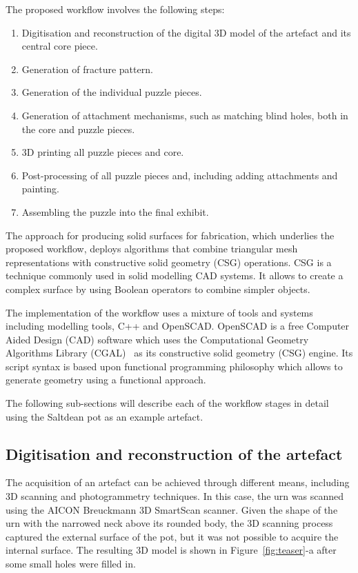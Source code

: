 \documentclass[acmlarge,screen,dvipsnames]{acmart}
\begin{document}
The proposed workflow involves the following steps:
%
\begin{enumerate}
\item Digitisation and reconstruction of the digital 3D model of the artefact and its central core piece.
\item Generation of fracture pattern.
\item Generation of the individual puzzle pieces.
\item Generation of attachment mechanisms, such as matching blind holes, both in the core and puzzle pieces.
\item 3D printing all puzzle pieces and core.
\item Post-processing of all puzzle pieces and, including adding attachments and painting.
\item Assembling the puzzle into the final exhibit.
\end{enumerate}
%

The approach for producing solid surfaces for fabrication, which
underlies the proposed workflow, deploys algorithms that combine
triangular mesh representations with constructive solid geometry (CSG)
operations. CSG is a technique commonly used in solid modelling CAD
systems. It allows to create a complex surface by using Boolean
operators to combine simpler objects.

The implementation of the workflow uses a mixture of tools and systems
including modelling tools, C++ and OpenSCAD. OpenSCAD is a free
Computer Aided Design (CAD) software which uses the Computational
Geometry Algorithms Library (CGAL)~\cite{cgal:eb-14a} as its constructive solid geometry
(CSG) engine. Its script syntax is based upon functional programming
philosophy which allows to generate geometry using a functional
approach.

The following sub-sections will describe each of the workflow stages
in detail using the Saltdean pot as an example artefact.

\subsection{Digitisation and reconstruction of the artefact}

The acquisition of an artefact can be achieved through different
means, including 3D scanning and photogrammetry techniques. In this
case, the urn was scanned using the AICON Breuckmann 3D SmartScan
scanner. Given the shape of the urn with the narrowed neck above its
rounded body, the 3D scanning process captured the external surface of
the pot, but it was not possible to acquire the internal surface. The
resulting 3D model is shown in Figure~\ref{fig:teaser}-a after some
small holes were filled in.
\end{document}
